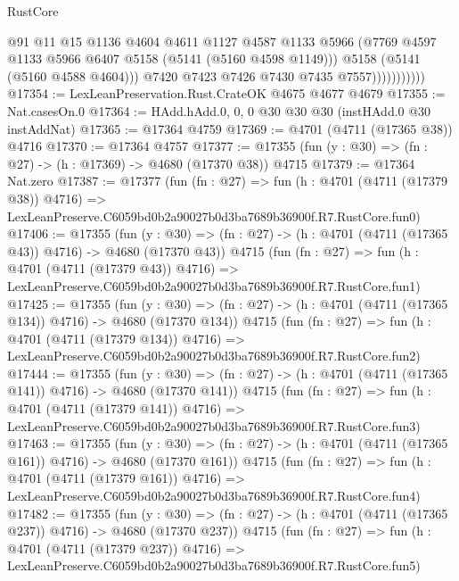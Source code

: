 \begin{lexlean}{RustCore}
\begin{coremodule}
                            @91
                            @11
                            @15
                            @1136
                            @4604
                            @4611
                            @1127
                            @4587
                            @1133
                            @5966
                            (@7769 @4597 @1133 @5966 @6407 @5158 (@5141 (@5160 @4598 @1149)))
                            @5158
                            (@5141 (@5160 @4588 @4604)))
                          @7420
                          @7423
                          @7426
                          @7430
                          @7435
                          @7557)))))))))))
@17354 := LexLeanPreservation.Rust.CrateOK @4675 @4677 @4679
@17355 := Nat.casesOn.{0}
@17364 := HAdd.hAdd.{0, 0, 0} @30 @30 @30 (instHAdd.{0} @30 instAddNat)
@17365 := @17364 @4759
@17369 := @4701 (@4711 (@17365 @38)) @4716
@17370 := @17364 @4757
@17377 := @17355 (fun (y : @30) => (fn : @27) -> (h : @17369) -> @4680 (@17370 @38)) @4715
@17379 := @17364 Nat.zero
@17387 := @17377
    (fun (fn : @27) =>
    fun (h : @4701 (@4711 (@17379 @38)) @4716) =>
    LexLeanPreserve.C6059bd0b2a90027b0d3ba7689b36900f.R7.RustCore.fun0)
@17406 := @17355
    (fun (y : @30) => (fn : @27) -> (h : @4701 (@4711 (@17365 @43)) @4716) -> @4680 (@17370 @43))
    @4715
    (fun (fn : @27) =>
    fun (h : @4701 (@4711 (@17379 @43)) @4716) =>
    LexLeanPreserve.C6059bd0b2a90027b0d3ba7689b36900f.R7.RustCore.fun1)
@17425 := @17355
    (fun (y : @30) => (fn : @27) -> (h : @4701 (@4711 (@17365 @134)) @4716) -> @4680 (@17370 @134))
    @4715
    (fun (fn : @27) =>
    fun (h : @4701 (@4711 (@17379 @134)) @4716) =>
    LexLeanPreserve.C6059bd0b2a90027b0d3ba7689b36900f.R7.RustCore.fun2)
@17444 := @17355
    (fun (y : @30) => (fn : @27) -> (h : @4701 (@4711 (@17365 @141)) @4716) -> @4680 (@17370 @141))
    @4715
    (fun (fn : @27) =>
    fun (h : @4701 (@4711 (@17379 @141)) @4716) =>
    LexLeanPreserve.C6059bd0b2a90027b0d3ba7689b36900f.R7.RustCore.fun3)
@17463 := @17355
    (fun (y : @30) => (fn : @27) -> (h : @4701 (@4711 (@17365 @161)) @4716) -> @4680 (@17370 @161))
    @4715
    (fun (fn : @27) =>
    fun (h : @4701 (@4711 (@17379 @161)) @4716) =>
    LexLeanPreserve.C6059bd0b2a90027b0d3ba7689b36900f.R7.RustCore.fun4)
@17482 := @17355
    (fun (y : @30) => (fn : @27) -> (h : @4701 (@4711 (@17365 @237)) @4716) -> @4680 (@17370 @237))
    @4715
    (fun (fn : @27) =>
    fun (h : @4701 (@4711 (@17379 @237)) @4716) =>
    LexLeanPreserve.C6059bd0b2a90027b0d3ba7689b36900f.R7.RustCore.fun5)

\end{coremodule}
\end{lexlean}
